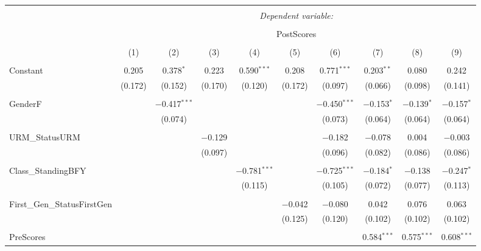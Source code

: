 
\begin{table}[!htbp] \centering 
  \caption{} 
  \label{} 
\begin{tabular}{@{\extracolsep{5pt}}lccccccccc} 
\\[-1.8ex]\hline 
\hline \\[-1.8ex] 
 & \multicolumn{9}{c}{\textit{Dependent variable:}} \\ 
\cline{2-10} 
\\[-1.8ex] & \multicolumn{9}{c}{PostScores} \\ 
\\[-1.8ex] & (1) & (2) & (3) & (4) & (5) & (6) & (7) & (8) & (9)\\ 
\hline \\[-1.8ex] 
 Constant & 0.205 & 0.378$^{*}$ & 0.223 & 0.590$^{***}$ & 0.208 & 0.771$^{***}$ & 0.203$^{**}$ & 0.080 & 0.242 \\ 
  & (0.172) & (0.152) & (0.170) & (0.120) & (0.172) & (0.097) & (0.066) & (0.098) & (0.141) \\ 
  & & & & & & & & & \\ 
 GenderF &  & $-$0.417$^{***}$ &  &  &  & $-$0.450$^{***}$ & $-$0.153$^{*}$ & $-$0.139$^{*}$ & $-$0.157$^{*}$ \\ 
  &  & (0.074) &  &  &  & (0.073) & (0.064) & (0.064) & (0.064) \\ 
  & & & & & & & & & \\ 
 URM\_StatusURM &  &  & $-$0.129 &  &  & $-$0.182 & $-$0.078 & 0.004 & $-$0.003 \\ 
  &  &  & (0.097) &  &  & (0.096) & (0.082) & (0.086) & (0.086) \\ 
  & & & & & & & & & \\ 
 Class\_StandingBFY &  &  &  & $-$0.781$^{***}$ &  & $-$0.725$^{***}$ & $-$0.184$^{*}$ & $-$0.138 & $-$0.247$^{*}$ \\ 
  &  &  &  & (0.115) &  & (0.105) & (0.072) & (0.077) & (0.113) \\ 
  & & & & & & & & & \\ 
 First\_Gen\_StatusFirstGen &  &  &  &  & $-$0.042 & $-$0.080 & 0.042 & 0.076 & 0.063 \\ 
  &  &  &  &  & (0.125) & (0.120) & (0.102) & (0.102) & (0.102) \\ 
  & & & & & & & & & \\ 
 PreScores &  &  &  &  &  &  & 0.584$^{***}$ & 0.575$^{***}$ & 0.608$^{***}$ \\ 

\end{tabular}
\end{table}
